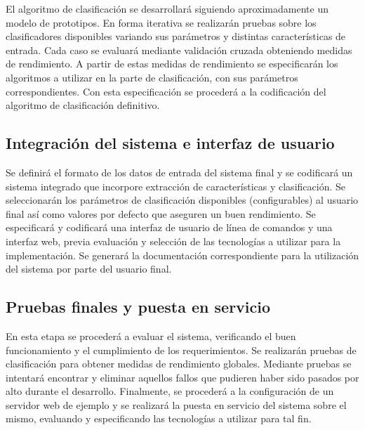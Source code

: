 \documentclass[12pt,bibliography=oldstyle,DIV=12,parskip=full-,titlepage]{scrartcl}
\begin{document}
El algoritmo de clasificación se desarrollará siguiendo
aproximadamente un modelo de prototipos. En forma iterativa se
realizarán pruebas sobre los clasificadores disponibles variando sus
parámetros y distintas características de entrada. Cada caso se
evaluará mediante validación cruzada obteniendo medidas de
rendimiento. A partir de estas medidas de rendimiento se especificarán
los algoritmos a utilizar en la parte de clasificación, con sus
parámetros correspondientes. Con esta especificación se procederá a la
codificación del algoritmo de clasificación definitivo.
%
\subsection{Integración del sistema e interfaz de usuario}
Se definirá el formato de los datos de entrada del sistema final y se
codificará un sistema integrado que incorpore extracción de
características y clasificación. Se seleccionarán los parámetros de
clasificación disponibles (configurables) al usuario final así como
valores por defecto que aseguren un buen rendimiento.
%
Se especificará y codificará una interfaz de usuario de línea de
comandos y una interfaz web, previa evaluación y selección de las
tecnologías a utilizar para la implementación.  Se generará la
documentación correspondiente para la utilización del sistema por
parte del usuario final.
%
\subsection{Pruebas finales y puesta en servicio}
En esta etapa se procederá a evaluar el sistema, verificando el buen
funcionamiento y el cumplimiento de los requerimientos. Se realizarán
pruebas de clasificación para obtener medidas de rendimiento
globales. Mediante pruebas se intentará encontrar y eliminar
aquellos fallos que pudieren haber sido pasados por alto durante el
desarrollo.
%
Finalmente, se procederá a la configuración de un servidor web de
ejemplo y se realizará la puesta en servicio del sistema sobre el
mismo, evaluando y especificando las tecnologías a utilizar para tal
fin.
%
%
\newpage
\end{document}
